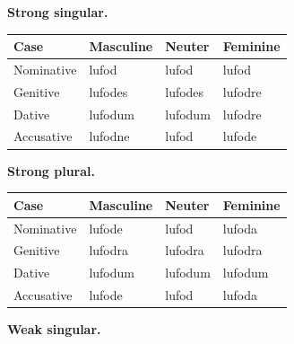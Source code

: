 \textbf{Strong singular.}

\par\begingroup
\fontsize{10.5}{13.2}\selectfont
\setlength{\LTleft}{0pt}\setlength{\LTright}{\fill}
\noindent
\begin{tabular}{@{}>{\raggedright\arraybackslash}p{22.0mm}>{\raggedright\arraybackslash}p{31.188mm}>{\raggedright\arraybackslash}p{31.188mm}>{\raggedright\arraybackslash}p{31.188mm}@{}}
\toprule
\textbf{Case} & \textbf{Masculine} & \textbf{Neuter} & \textbf{Feminine} \\
\midrule
Nominative & lufod & lufod & lufod \\
Genitive & lufodes & lufodes & lufodre \\
Dative & lufodum & lufodum & lufodre \\
Accusative & lufodne & lufod & lufode \\
\bottomrule
\end{tabular}
\par\endgroup
\textbf{Strong plural.}

\par\begingroup
\fontsize{10.5}{13.2}\selectfont
\setlength{\LTleft}{0pt}\setlength{\LTright}{\fill}
\noindent
\begin{tabular}{@{}>{\raggedright\arraybackslash}p{22.0mm}>{\raggedright\arraybackslash}p{31.188mm}>{\raggedright\arraybackslash}p{31.188mm}>{\raggedright\arraybackslash}p{31.188mm}@{}}
\toprule
\textbf{Case} & \textbf{Masculine} & \textbf{Neuter} & \textbf{Feminine} \\
\midrule
Nominative & lufode & lufod & lufoda \\
Genitive & lufodra & lufodra & lufodra \\
Dative & lufodum & lufodum & lufodum \\
Accusative & lufode & lufod & lufoda \\
\bottomrule
\end{tabular}
\par\endgroup
\textbf{Weak singular.}

